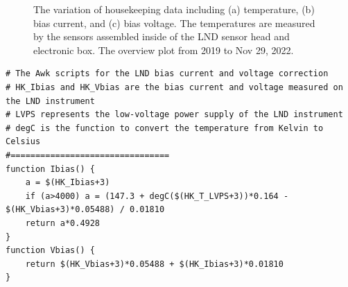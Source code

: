 \begin{figure}[!htb]
    \centering
    \caption[LND temperature, bias current, and bias voltage variations]{The variation of housekeeping data including (a) temperature, (b) bias current, and (c) bias voltage. The temperatures are measured by the sensors assembled inside of the LND sensor head and electronic box. The overview plot from 2019 to Nov 29, 2022. }
    \label{Fig:appendix_LND_Housekeeping}
\end{figure}



\begin{lstlisting}[float]
# The Awk scripts for the LND bias current and voltage correction
# HK_Ibias and HK_Vbias are the bias current and voltage measured on the LND instrument
# LVPS represents the low-voltage power supply of the LND instrument
# degC is the function to convert the temperature from Kelvin to Celsius
#================================
function Ibias() {
    a = $(HK_Ibias+3)
    if (a>4000) a = (147.3 + degC($(HK_T_LVPS+3))*0.164 - $(HK_Vbias+3)*0.05488) / 0.01810
    return a*0.4928
}
function Vbias() {
    return $(HK_Vbias+3)*0.05488 + $(HK_Ibias+3)*0.01810
}

\end{lstlisting}

